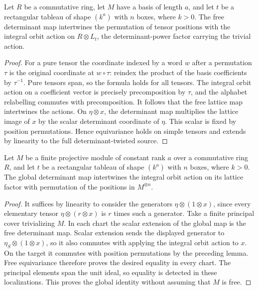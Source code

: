 \begin{lemma}
\label{lem:free-determinant-permutation}
\leanok
Let $R$ be a commutative ring, let $M$ have a basis of length $a$,
and let $t$ be a rectangular tableau of shape $(k^a)$ with $n$ boxes,
where $k>0$. The free determinant map intertwines the permutation
of tensor positions with the integral orbit action on $R\otimes L_t$,
the determinant-power factor carrying the trivial action.
\end{lemma}
\begin{proof}
For a pure tensor the coordinate indexed by a word $w$ after a
permutation $\tau$ is the original coordinate at $w\circ\tau$:
reindex the product of the basis coefficients by $\tau^{-1}$.
Pure tensors span, so the formula holds for all tensors. The integral
orbit action on a coefficient vector is precisely precomposition by
$\tau$, and the alphabet relabelling commutes with precomposition.
It follows that the free lattice map intertwines the actions. On
$\eta\otimes x$, the determinant map multiplies the lattice image of
$x$ by the scalar determinant coordinate of $\eta$. This scalar is
fixed by position permutations. Hence equivariance holds on simple
tensors and extends by linearity to the full determinant-twisted source.
\end{proof}

\begin{lemma}
\label{lem:projective-determinant-permutation}
\leanok
Let $M$ be a finite projective module of constant rank $a$ over a
commutative ring $R$, and let $t$ be a rectangular tableau of shape
$(k^a)$ with $n$ boxes, where $k>0$. The global determinant map
intertwines the integral orbit action on its lattice factor with
permutation of the positions in $M^{\otimes n}$.
\end{lemma}
\begin{proof}
It suffices by linearity to consider the generators
$\eta\otimes(1\otimes x)$, since every elementary tensor
$\eta\otimes(r\otimes x)$ is $r$ times such a generator.
Take a finite principal cover trivializing $M$. In each chart the
scalar extension of the global map is the free determinant map.
Scalar extension sends the displayed generator to
$\eta_S\otimes(1\otimes x)$, so it also commutes with applying the
integral orbit action to $x$. On the target it commutes with position
permutations by the preceding lemma. Free equivariance therefore
proves the desired equality in every chart. The principal elements
span the unit ideal, so equality is detected in these localizations.
This proves the global identity without assuming that $M$ is free.
\end{proof}

